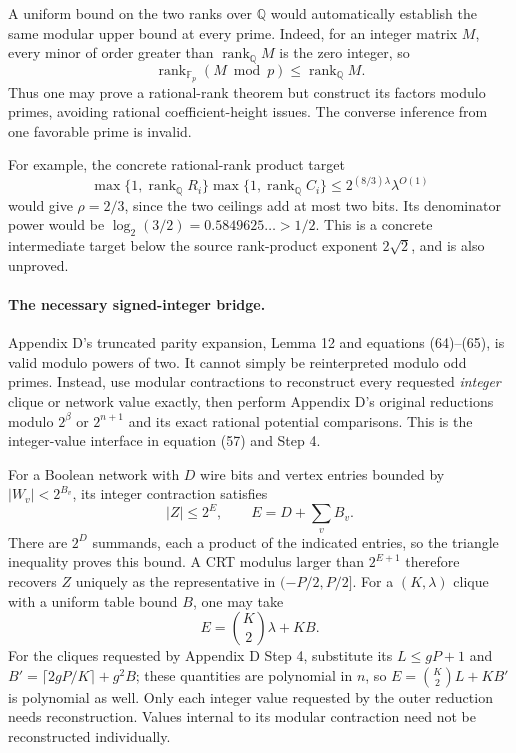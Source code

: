 A uniform bound on the two ranks over $\mathbb Q$ would automatically
establish the same modular upper bound at every prime. Indeed, for an
integer matrix $M$, every minor of order greater than
$\operatorname{rank}_{\mathbb Q}M$ is the zero integer, so
\[
 \operatorname{rank}_{\mathbb F_p}(M\bmod p)
 \le \operatorname{rank}_{\mathbb Q}M.
\]
Thus one may prove a rational-rank theorem but construct its factors
modulo primes, avoiding rational coefficient-height issues. The
converse inference from one favorable prime is invalid.

For example, the concrete rational-rank product target
\[
 \max\{1,\operatorname{rank}_{\mathbb Q}R_i\}
 \max\{1,\operatorname{rank}_{\mathbb Q}C_i\}
 \le 2^{(8/3)\lambda}\lambda^{O(1)}
\]
would give $\rho=2/3$, since the two ceilings add at most two bits.
Its denominator power would be
$\log_2(3/2)=0.5849625\ldots>1/2$. This is a concrete intermediate
target below the source rank-product exponent $2\sqrt2$, and is
also unproved.

\paragraph{The necessary signed-integer bridge.}
Appendix D's truncated parity expansion, Lemma 12 and equations
(64)--(65), is valid modulo powers of two. It cannot simply be
reinterpreted modulo odd primes. Instead, use modular contractions
to reconstruct every requested \emph{integer} clique or network value
exactly, then perform Appendix D's original reductions modulo
$2^\beta$ or $2^{n+1}$ and its exact rational potential comparisons.
This is the integer-value interface in equation (57) and Step 4.

For a Boolean network with $D$ wire bits and vertex entries bounded
by $|W_v|<2^{B_v}$, its integer contraction satisfies
\begin{equation}\label{eq:modular-signed-height}
 |Z|\le2^E,\qquad E=D+\sum_vB_v.
\end{equation}
There are $2^D$ summands, each a product of the indicated entries,
so the triangle inequality proves this bound. A CRT modulus larger
than $2^{E+1}$ therefore recovers $Z$ uniquely as the representative
in $(-P/2,P/2]$. For a $(K,\lambda)$ clique with a uniform table
bound $B$, one may take
\[
 E=\binom K2\lambda+KB.
\]
For the cliques requested by Appendix D Step 4, substitute its
$L\le gP+1$ and $B'=\lceil2gP/K\rceil+g^2B$; these quantities
are polynomial in $n$, so $E=\binom K2L+KB'$ is polynomial as well.
Only each integer value requested by the outer reduction needs
reconstruction. Values internal to its modular contraction need
not be reconstructed individually.

